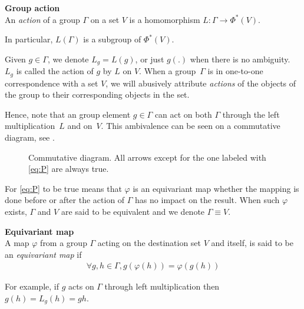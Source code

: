 \begin{definition}\textbf{Group action}\\
An \emph{action} of a group $\Gamma$ on a set $V$ is a homomorphism $L: \Gamma \to \Phi^*(V)$.
\end{definition}

In particular, $L(\Gamma)$ is a subgroup of $\Phi^*(V)$.

\begin{remark}
Given $g \in \Gamma$, we denote $L_g = L(g)$, or just $g(.)$ when there is no ambiguity. $L_g$ is called the action of $g$ by $L$ on $V$. When a group~$\Gamma$ is in one-to-one correspondence with a set $V$, we will abusively attribute \emph{actions} of the objects of the group to their corresponding objects in the set.
\end{remark}

Hence, note that an group element $g \in \Gamma$ can act on both $\Gamma$ through the left multiplication~$L$ and on~$V$. This ambivalence can be seen on a commutative diagram, see .%

\begin{figure}[H]
\centering
{}
\caption{Commutative diagram. All arrows except for the one labeled with \eqref{eq:P} are always true.}
\label{fig:com}
\end{figure}

For \eqref{eq:P} to be true means that $\varphi$ is an equivariant map \ie whether the mapping is done before or after the action of $\Gamma$ has no impact on the result. When such $\varphi$ exists, $\Gamma$ and $V$ are said to be equivalent and we denote $\Gamma \equiv V$.

\begin{definition}\textbf{Equivariant map}\\
A map $\varphi$ from a group $\Gamma$ acting on the destination set $V$ and itself, is said to be an \emph{equivariant map} if
\begin{gather*}
\forall g, h \in \Gamma, g(\varphi(h)) = \varphi(g(h))
\end{gather*}
\label{def:eqmap}
\end{definition}
\begin{remark} For example, if $g$ acts on $\Gamma$ through left multiplication then $g(h) = L_g(h) = gh$.
\end{remark}

